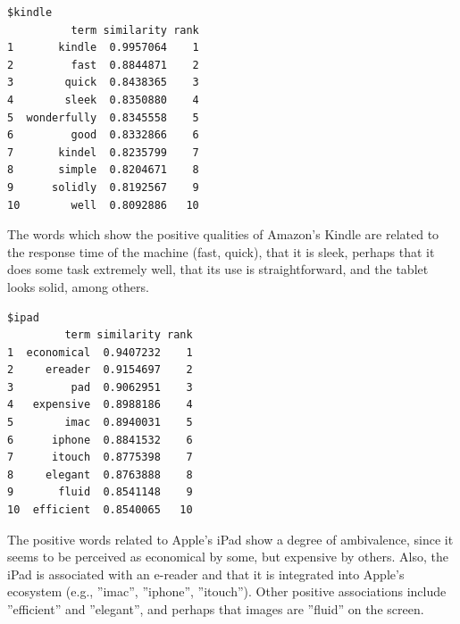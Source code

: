 \begin{Shaded}
\begin{Highlighting}[]
\OtherTok{\textless{}{-}}  \NormalTok{, } \NormalTok{)}
\OtherTok{\textless{}{-}}  \NormalTok{, } \NormalTok{)}

\end{Highlighting}
\end{Shaded}

\begin{verbatim}
$kindle
          term similarity rank
1       kindle  0.9957064    1
2         fast  0.8844871    2
3        quick  0.8438365    3
4        sleek  0.8350880    4
5  wonderfully  0.8345558    5
6         good  0.8332866    6
7       kindel  0.8235799    7
8       simple  0.8204671    8
9      solidly  0.8192567    9
10        well  0.8092886   10
\end{verbatim}

The words which show the positive qualities of Amazon's Kindle are related to the response time of the machine (fast, quick),
that it is sleek, perhaps that it does some task extremely well, that its use is
straightforward, and the tablet looks solid, among others.

\begin{Shaded}
\begin{Highlighting}[]
\end{Highlighting}
\end{Shaded}

\begin{verbatim}
$ipad
         term similarity rank
1  economical  0.9407232    1
2     ereader  0.9154697    2
3         pad  0.9062951    3
4   expensive  0.8988186    4
5        imac  0.8940031    5
6      iphone  0.8841532    6
7      itouch  0.8775398    7
8     elegant  0.8763888    8
9       fluid  0.8541148    9
10  efficient  0.8540065   10
\end{verbatim}

The positive words related to Apple's iPad show a degree of ambivalence,
since it seems to be perceived as economical by some, but expensive
by others. Also, the iPad is associated with an e-reader and that it is
integrated into Apple's ecosystem (e.g., ''imac'', ''iphone'', ''itouch''). Other
positive associations include ''efficient'' and ''elegant'', and perhaps that images
are ''fluid'' on the screen.

